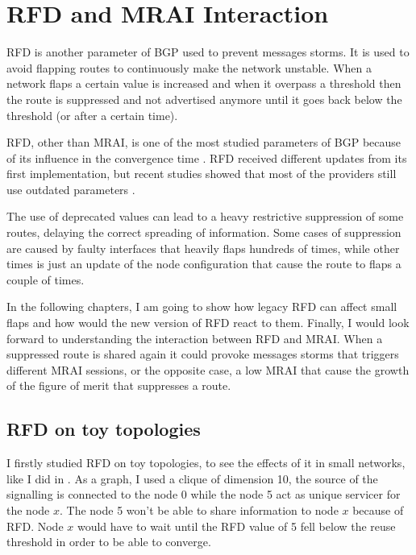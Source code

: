 \chapter{RFD and MRAI Interaction}
\label{cha:bgp_rfd_vs_mrai}

\ac{RFD} is another parameter of \ac{BGP} used to prevent messages storms.
It is used to avoid flapping routes to continuously make the network unstable.
When a network flaps a certain value is increased and when it overpass a threshold
then the route is suppressed and not advertised anymore until it goes back
below the threshold (or after a certain time).

\ac{RFD}, other than \ac{MRAI}, is one of the most studied parameters of \ac{BGP}
because of its influence in the convergence time \cite{mao2002route,pelsser2011route}.
\ac{RFD} received different updates from its first implementation, but recent
studies showed that most of the providers still use outdated parameters \cite{gray2020bgp}.

The use of deprecated values can lead to a heavy restrictive suppression
of some routes, delaying the correct spreading of information.
Some cases of suppression are caused by faulty interfaces that heavily flaps hundreds of times,
while other times is just an update of the node configuration that
cause the route to flaps a couple of times.

In the following chapters, I am going to show how legacy \ac{RFD} can affect
small flaps and how would the new version of \ac{RFD} react to them.
Finally, I would look forward to understanding the interaction between \ac{RFD}
and \ac{MRAI}.
When a suppressed route is shared again it could provoke messages storms that
triggers different \ac{MRAI} sessions, or the opposite case, a low \ac{MRAI} that
cause the growth of the figure of merit that suppresses a route.

\section{RFD on toy topologies}
\label{sec:bgp_rfd_toy}

I firstly studied \ac{RFD} on toy topologies, to see the effects of it in small
networks, like I did in .
As a graph, I used a clique of dimension \num{10}, the source of the signalling
is connected to the node \num{0} while the node \num{5} act as unique servicer
for the node $x$.
The node \num{5} won't be able to share information to node $x$ because of \ac{RFD}.
Node $x$ would have to wait until the \ac{RFD} value of \num{5} fell below
the reuse threshold in order to be able to converge.


